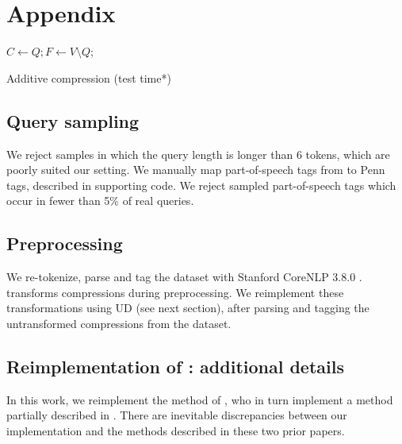 \appendix

\section{Appendix}

\begin{algorithm}[]
\SetAlgoLined
{}
 $ C \gets Q;  F \gets V \setminus Q$; \\
 \caption{Additive compression {\small(test time*)}}
\end{algorithm}\label{a:algo}

\subsection{Query sampling}
We reject samples in which the query length is longer than 6 tokens, which are poorly suited our setting. We manually map part-of-speech tags from \citet{Barr2008TheLS} to Penn tags, described in supporting code. We reject sampled part-of-speech tags which occur in fewer than 5\% of real queries.

\subsection{Preprocessing}
We re-tokenize, parse and tag the \citet{filippova2013overcoming} dataset with Stanford CoreNLP 3.8.0 \cite{corenlp}. \citet{filippova2013overcoming} transforms compressions during preprocessing. We reimplement these transformations using UD (see next section), after parsing and tagging the untransformed compressions from the dataset.

\subsection{Reimplementation of \citet{filippova2013overcoming}: additional details}

In this work, we reimplement the method of \citet{filippova2013overcoming}, who in turn implement a method partially described in \citet{filippova2008dependency}.  There are inevitable discrepancies between our implementation and the methods described in these two prior papers.  

